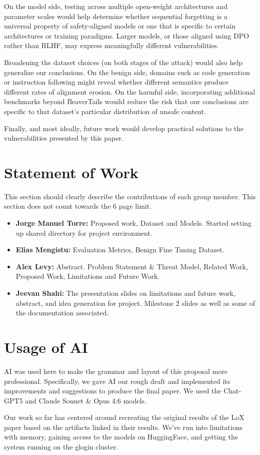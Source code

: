 \documentclass[letterpaper,twocolumn,10pt]{article}
\begin{document}
On the model side, testing across multiple open-weight architectures and parameter scales would help determine whether sequential forgetting is a universal property of safety-aligned models or one that is specific to certain architectures or training paradigms. Larger models, or those aligned using DPO rather than RLHF, may express meaningfully different vulnerabilities.

Broadening the dataset choices (on both stages of the attack) would also help generalize our conclusions. On the benign side, domains such as code generation or instruction following might reveal whether different semantics produce different rates of alignment erosion. On the harmful side, incorporating additional benchmarks beyond BeaverTails wouild reduce the risk that our conclusions are specific to that dataset's particular distribution of unsafe content.

Finally, and most ideally, future work would develop practical solutions to the vulnerabilities presented by this paper.

\section*{Statement of Work}

This section should clearly describe the contributions of each group member. This section does not count towards the 6 page limit.

\begin{itemize}
    \item \textbf{Jorge Manuel Torre:} Proposed work, Dataset and Models. Started setting up shared directory for project environment.
    \item \textbf{Elias Mengistu:} Evaluation Metrics, Benign Fine Tuning Dataset.
    \item \textbf{Alex Levy:} Abstract. Problem Statement \& Threat Model, Related Work, Proposed Work, Limitations and Future Work.
    \item \textbf{Jeevan Shahi:} The presentation slides on limitations and future work, abstract, and idea generation for project. Milestone 2 slides as well as some of the documentation associated.
\end{itemize}

\section*{Usage of AI}

AI was used here to make the grammar and layout of this proposal more professional. Specifically, we gave AI our rough draft and implemented its improvements and suggestions to produce the final paper. We used the Chat-GPT5 and Claude Sonnet \& Opus 4.6 models.

{\footnotesize 
}


\theendnotes

Our work so far has centered around recreating the original results of the LoX paper based on the artifacts linked in their results. We've run into limitations with memory, gaining access to the models on HuggingFace, and getting the system running on the glogin cluster.
\end{document}
